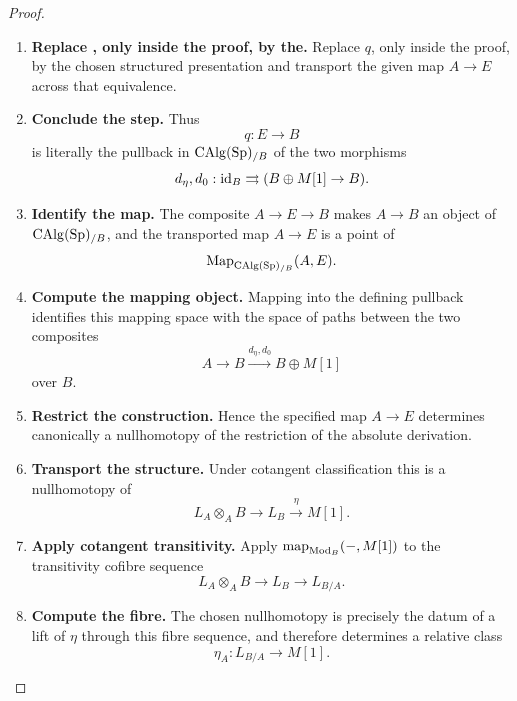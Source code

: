 \begin{proof}
\leavevmode
\begin{enumerate}[label=\textup{(\arabic*)}]
    \item \textbf{Replace , only inside the proof, by the.}
    Replace \(q\), only inside the proof, by the chosen structured presentation and
    transport the given map \(A\to E\) across that equivalence.

    \item \textbf{Conclude the step.}
    Thus
    \[
        q:E\longrightarrow B
    \]
    is literally the pullback in \(\operatorname{CAlg}(\operatorname{Sp})_{/B}\) of the two morphisms
    \[
        d_\eta,d_0:
        \operatorname{id}_B\rightrightarrows
        (B\oplus M[1]\to B).
    \]

    \item \textbf{Identify the map.}
    The composite \(A\to E\to B\) makes \(A\to B\) an object of \(\operatorname{CAlg}(\operatorname{Sp})_{/B}\), and the transported
    map \(A\to E\) is a point of
    \[
        \operatorname{Map}_{\operatorname{CAlg}(\operatorname{Sp})_{/B}}(A,E).
    \]

    \item \textbf{Compute the mapping object.}
    Mapping into the defining pullback identifies this mapping space with the space of paths
    between the two composites
    \[
        A\longrightarrow B
        \xrightarrow{d_\eta,d_0}
        B\oplus M[1]
    \]
    over \(B\).

    \item \textbf{Restrict the construction.}
    Hence the specified map \(A\to E\) determines canonically a nullhomotopy of the restriction
    of the absolute derivation.

    \item \textbf{Transport the structure.}
    Under cotangent classification this is a nullhomotopy of
    \[
        L_A\otimes_AB
        \longrightarrow
        L_B
        \xrightarrow{\eta}
        M[1].
    \]

    \item \textbf{Apply cotangent transitivity.}
    Apply \(\operatorname{map}_{\operatorname{Mod}_B}(-,M[1])\) to the transitivity cofibre sequence
    \[
        L_A\otimes_AB
        \longrightarrow
        L_B
        \longrightarrow
        L_{B/A}.
    \]

    \item \textbf{Compute the fibre.}
    The chosen nullhomotopy is precisely the datum of a lift of \(\eta\) through this fibre
    sequence, and therefore determines a relative class
    \[
        \eta_A:L_{B/A}\longrightarrow M[1].
    \]


\end{enumerate}
\end{proof}
